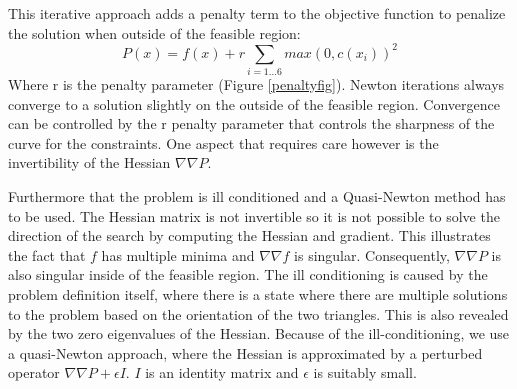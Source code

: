 \documentclass[times,12pt]{article}
\begin{document}
This iterative approach adds a penalty term to the objective function to penalize the solution when outside of the feasible region: 
\begin{equation}\label{eq:penalty}
P(x)=f(x)+r\sum_{i=1...6}max(0,c(x_{i}))^{2}
\end{equation}
Where r is the penalty parameter (Figure \ref{penaltyfig}). Newton iterations always converge to a solution slightly on the outside of the feasible region. Convergence can be controlled by the r penalty parameter that controls the sharpness of the curve for the constraints. One aspect that requires care however is the invertibility of the Hessian $\nabla\nabla P$. 

Furthermore that the problem is ill conditioned and a Quasi-Newton method has to be used. The Hessian matrix is not invertible so it is not possible to solve the direction of the search by computing the Hessian and gradient. This illustrates the fact that $f$ has multiple minima and $\nabla\nabla f$ is singular. Consequently, $\nabla\nabla P$ is also singular inside of the feasible region. The ill conditioning is caused by the problem definition itself, where there is a state where there are multiple solutions to the problem based on the orientation of the two triangles. This is also revealed by the two zero eigenvalues of the Hessian. Because of the ill-conditioning, we use a quasi-Newton approach, where the Hessian is approximated by a perturbed operator $\nabla\nabla P + \epsilon I$. $I$ is an identity matrix and $\epsilon$ is suitably small. 
\end{document}
